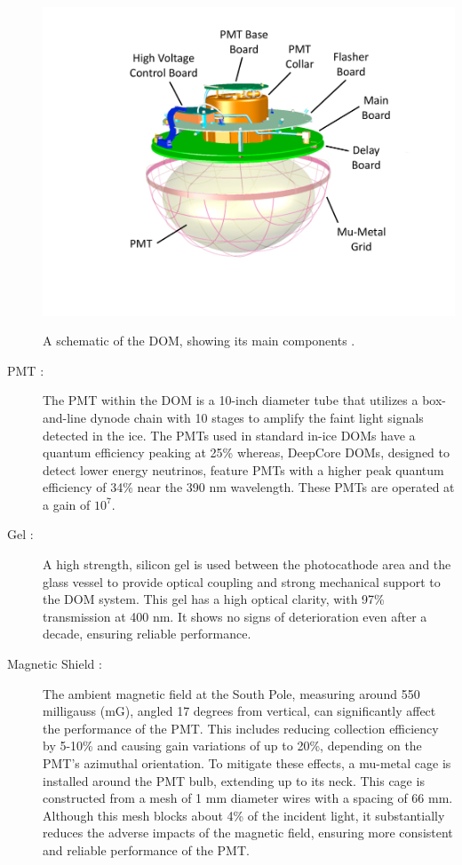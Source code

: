 \begin{description}
    \begin{marginfigure}
        \includegraphics{./figures/nu_in_icecube/domfig1a-DOM3DModel.pdf}
        \caption{A schematic of the DOM, showing its main components \cite{Aartsen_2017}.}
    \end{marginfigure}

    \item[PMT :] The PMT within the DOM is a 10-inch diameter tube that utilizes a box-and-line dynode chain with 10 stages to amplify the faint light signals detected in the ice. The PMTs used in standard in-ice DOMs have a quantum efficiency peaking at 25\% whereas, DeepCore DOMs, designed to detect lower energy neutrinos, feature PMTs with a higher peak quantum efficiency of 34\% near the 390 nm wavelength. These PMTs are operated at a gain of $10^7$.

    \item[Gel :] A high strength, silicon gel is used between the photocathode area and the glass vessel to provide optical coupling and strong mechanical support to the DOM system. This gel has a high optical clarity, with 97\% transmission at 400 nm. It shows no signs of deterioration even after a decade, ensuring reliable performance.

    \item[Magnetic Shield :] The ambient magnetic field at the South Pole, measuring around 550 milligauss (mG), angled 17 degrees from vertical, can significantly affect the performance of the PMT. This includes reducing collection efficiency by 5-10\% and causing gain variations of up to 20\%, depending on the PMT's azimuthal orientation. To mitigate these effects, a mu-metal cage is installed around the PMT bulb, extending up to its neck. This cage is constructed from a mesh of 1 mm diameter wires with a spacing of 66 mm. Although this mesh blocks about 4\% of the incident light, it substantially reduces the adverse impacts of the magnetic field, ensuring more consistent and reliable performance of the PMT.


\end{description}
